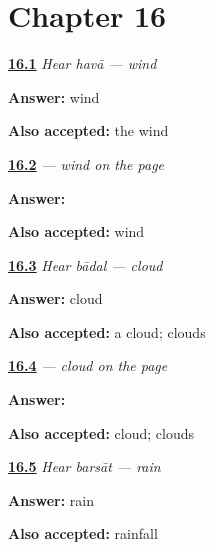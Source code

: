 \section*{Chapter 16}

\noindent\begin{minipage}[t]{\linewidth}
\raggedright
\hyperlink{review-MW-C11-hear-hawa-meaning}{\textbf{16.1}} \emph{Hear \emph{havā} — wind}\par
\small \textbf{Answer:} wind\par
\footnotesize \textbf{Also accepted:} the wind
\end{minipage}\par\medskip

\noindent\begin{minipage}[t]{\linewidth}
\raggedright
\hyperlink{review-MW-C11-hawa-dictation}{\textbf{16.2}} \emph{ — wind on the page}\par
\small \textbf{Answer:} \par
\footnotesize \textbf{Also accepted:}  wind
\end{minipage}\par\medskip

\noindent\begin{minipage}[t]{\linewidth}
\raggedright
\hyperlink{review-MW-C11-hear-baadal-meaning}{\textbf{16.3}} \emph{Hear \emph{bādal} — cloud}\par
\small \textbf{Answer:} cloud\par
\footnotesize \textbf{Also accepted:} a cloud; clouds
\end{minipage}\par\medskip

\noindent\begin{minipage}[t]{\linewidth}
\raggedright
\hyperlink{review-MW-C11-baadal-dictation}{\textbf{16.4}} \emph{ — cloud on the page}\par
\small \textbf{Answer:} \par
\footnotesize \textbf{Also accepted:}  cloud;  clouds
\end{minipage}\par\medskip

\noindent\begin{minipage}[t]{\linewidth}
\raggedright
\hyperlink{review-MW-C11-hear-barsaat-meaning}{\textbf{16.5}} \emph{Hear \emph{barsāt} — rain}\par
\small \textbf{Answer:} rain\par
\footnotesize \textbf{Also accepted:} rainfall
\end{minipage}\par\medskip

